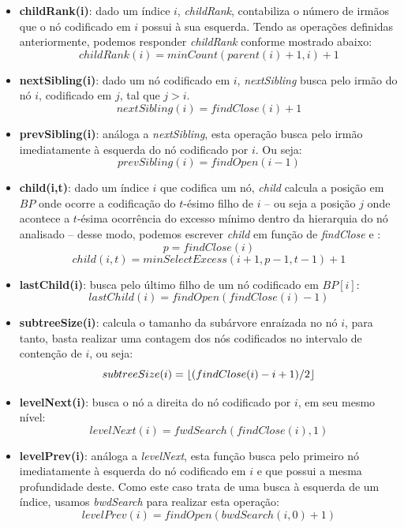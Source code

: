 \begin{itemize}
        \item \textbf{childRank(i)}: dado um índice $i$, \textit{childRank}, contabiliza o número de irmãos que o nó codificado em $i$ possui à sua esquerda. Tendo as operações definidas anteriormente, podemos responder \textit{childRank} conforme mostrado abaixo:
        $$
               childRank(i) = minCount(parent(i)+1, i) +1
        $$
        
        \item \textbf{nextSibling(i)}: dado um nó codificado em $i$, \textit{nextSibling} busca pelo irmão do nó $i$, codificado em $j$, tal que $j>i$.
        $$nextSibling(i) = findClose(i) +1$$
        
        \item \textbf{prevSibling(i)}: análoga a \textit{nextSibling}, esta operação busca pelo irmão imediatamente à esquerda do nó codificado por $i$. Ou seja:
        $$prevSibling(i) = findOpen(i-1)$$
        
        \item \textbf{child(i,t)}: dado um índice $i$ que codifica um nó, \textit{child} calcula a posição em $BP$ onde ocorre a codificação do $t$-ésimo filho de $i$  -- ou seja a posição $j$ onde acontece a $t$-ésima ocorrência do excesso mínimo dentro da hierarquia do nó analisado --  desse modo, podemos escrever
        \textit{child} em função de \textit{findClose} e :
        $$p = findClose(i)$$
        $$child(i,t) = minSelectExcess(i+1,p-1,t-1) + 1 $$

        \item \textbf{lastChild(i)}: busca pelo último filho de um nó codificado em $BP[i]$:
        $$lastChild(i) = findOpen(findClose(i)-1)$$
        
        \item  \textbf{subtreeSize(i)}: calcula o tamanho da subárvore enraízada no nó $i$, para tanto, basta realizar uma contagem dos nós codificados no intervalo de contenção de $i$, ou seja:
        $$subtreeSize(i)= \lfloor(findClose(i) - i + 1)/2\rfloor$$
        
        \item \textbf{levelNext(i)}: busca o nó a direita do nó codificado por $i$, em seu mesmo nível:
        $$levelNext(i) = fwdSearch(findClose(i),1)$$
        
        \item \textbf{levelPrev(i)}: análoga a \textit{levelNext}, esta função busca pelo primeiro nó imediatamente à esquerda do nó codificado em $i$ e que possui a mesma profundidade deste. Como este caso trata de uma busca à esquerda de um índice, usamos \textit{bwdSearch} para realizar esta operação:
        $$levelPrev(i) = findOpen(bwdSearch(i,0)+1)$$
        

\end{itemize}
